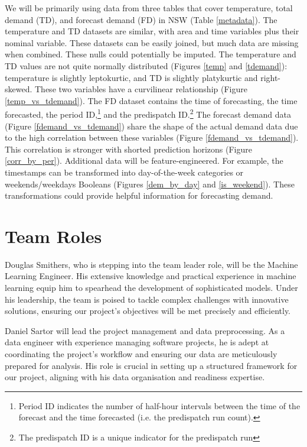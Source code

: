 \documentclass[mstat,12pt]{unswthesis}
\begin{document}
We will be primarily using data from three tables that cover temperature, total demand (TD), and forecast demand (FD) in NSW (Table \ref{metadata}). The temperature and TD datasets are similar, with area and time variables plus their nominal variable. These datasets can be easily joined, but much data are missing when combined. These nulls could potentially be imputed. The temperature and TD values are not quite normally distributed (Figures \ref{temp} and \ref{tdemand}): temperature is slightly leptokurtic, and TD is slightly platykurtic and right-skewed. These two variables have a curvilinear relationship (Figure \ref{temp_vs_tdemand}). The FD dataset contains the time of forecasting, the time forecasted, the period ID,\footnote{Period ID indicates the number of half-hour intervals between the time of the forecast and the time forecasted (i.e. the predispatch run count).} and the predispatch ID.\footnote{The predispatch ID is a unique indicator for the predispatch run} The forecast demand data (Figure \ref{fdemand_vs_tdemand}) share the shape of the actual demand data due to the high correlation between these variables (Figure \ref{fdemand_vs_tdemand}). This correlation is stronger with shorted prediction horizons (Figure \ref{corr_by_per}). Additional data will be feature-engineered. For example, the timestamps can be transformed into day-of-the-week categories or weekends/weekdays Booleans (Figures \ref{dem_by_day} and \ref{is_weekend}). These transformations could provide helpful information for forecasting demand.

\hypertarget{team-roles}{
    \section{Team Roles}
    \label{team-roles}
}

Douglas Smithers, who is stepping into the team leader role, will be the Machine Learning Engineer. His extensive knowledge and practical experience in machine learning equip him to spearhead the development of sophisticated models. Under his leadership, the team is poised to tackle complex challenges with innovative solutions, ensuring our project's objectives will be met precisely and efficiently. \newline

Daniel Sartor will lead the project management and data preprocessing. As a data engineer with experience managing software projects, he is adept at coordinating the project's workflow and ensuring our data are meticulously prepared for analysis. His role is crucial in setting up a structured framework for our project, aligning with his data organisation and readiness expertise. \newline
\end{document}
